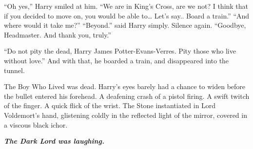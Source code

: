“Oh yes,” Harry smiled at him. “We are in King’s Cross, are we not? I think that if you decided to move on, you would be able to… Let’s say.. Board a train.”
\SmallVSpace
“And where would it take me?”
\SmallVSpace
“Beyond.” said Harry simply.
\SmallVSpace
Silence again.
\SmallVSpace
“Goodbye, Headmaster. And thank you, truly.”

“Do not pity the dead, Harry James Potter-Evans-Verres. Pity those who live without love.” And with that, he boarded a train, and disappeared into the tunnel.
\simpleline
{}

\begin{flushright}
The Boy Who Lived was dead.
\SmallVSpace
Harry’s eyes barely had a chance to widen before the bullet entered his forehead.
\SmallVSpace
A deafening crash of a pistol firing.
\SmallVSpace
A swift twitch of the finger.
\SmallVSpace
A quick flick of the wrist.
\SmallVSpace
The Stone instantiated in Lord Voldemort’s hand, glistening coldly in the reflected light of the mirror, covered in a viscous black ichor.
\end{flushright}
\simpleline

\textbf{\textit{The Dark Lord was laughing.}}
